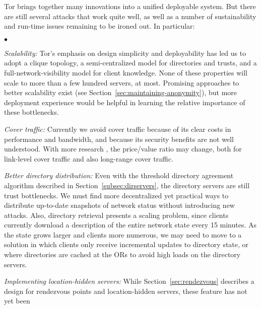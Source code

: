 \documentclass[times,10pt,twocolumn]{article}
\newenvironment{tightlist}{\begin{list}{$\bullet$}{
  \setlength{\itemsep}{0mm}
    \setlength{\parsep}{0mm}
    }}{\end{list}}
\begin{document}
\label{sec:conclusion}

Tor brings together many innovations into
a unified deployable system. But there are still several attacks that
work quite well, as well as a number of sustainability and run-time
issues remaining to be ironed out. In particular:

%
\begin{tightlist}
\item \emph{Scalability:} Tor's emphasis on design simplicity and
  deployability has led us to adopt a clique topology, a
  semi-centralized model for directories and trusts, and a
  full-network-visibility model for client knowledge.  None of these
  properties will scale to more than a few hundred servers, at most.
  Promising approaches to better scalability exist (see
  Section~\ref{sec:maintaining-anonymity}), but more deployment
  experience would be helpful in learning the relative importance of
  these bottlenecks.
\item \emph{Cover traffic:} Currently we avoid cover traffic because
  of its clear costs in performance and bandwidth, and because its
  security benefits are not well understood. With more research
  \cite{SS03,defensive-dropping}, the price/value ratio may change,
  both for link-level cover traffic and also long-range cover traffic.
\item \emph{Better directory distribution:} Even with the threshold
  directory agreement algorithm described in Section~\ref{subsec:dirservers},
  the directory servers are still trust bottlenecks. We must find more
  decentralized yet practical ways to distribute up-to-date snapshots of
  network status without introducing new attacks.  Also, directory
  retrieval presents a scaling problem, since clients currently
  download a description of the entire network state every 15
  minutes.  As the state grows larger and clients more numerous, we
  may need to move to a solution in which clients only receive
  incremental updates to directory state, or where directories are
  cached at the ORs to avoid high loads on the directory servers.
\item \emph{Implementing location-hidden servers:} While
  Section~\ref{sec:rendezvous} describes a design for rendezvous
  points and location-hidden servers, these feature has not yet been

\end{tightlist}
\end{document}
